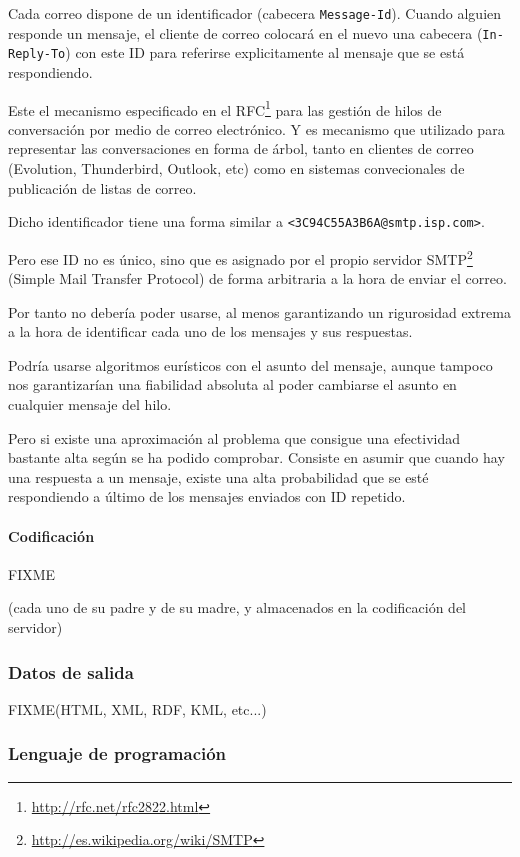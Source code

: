Cada correo dispone de un identificador (cabecera \texttt{Message-Id}). Cuando
alguien responde un mensaje, el cliente de correo colocará en el nuevo una 
cabecera (\texttt{In-Reply-To}) con este ID para referirse explicitamente al 
mensaje que se está respondiendo.

Este el mecanismo especificado en el RFC\footnote{\url{http://rfc.net/rfc2822.html}} 
para las gestión de hilos de conversación por medio de correo electrónico. Y es
mecanismo que utilizado para representar las conversaciones en forma de árbol, 
tanto en clientes de correo (Evolution, Thunderbird, Outlook, etc) como en sistemas 
convecionales de publicación de listas de correo.

Dicho identificador tiene una forma similar a \texttt{<3C94C55A3B6A@smtp.isp.com>}.

Pero ese ID no es único, sino que es asignado por el propio servidor
SMTP\footnote{\url{http://es.wikipedia.org/wiki/SMTP}} (Simple Mail Transfer Protocol) 
de forma arbitraria a la hora de enviar el correo.

Por tanto no debería poder usarse, al menos garantizando un rigurosidad extrema
a la hora de identificar cada uno de los mensajes y sus respuestas.

Podría usarse algoritmos eurísticos con el asunto del mensaje, aunque tampoco nos
garantizarían una fiabilidad absoluta al poder cambiarse el asunto en cualquier
mensaje del hilo.

Pero si existe una aproximación al problema que consigue una efectividad bastante
alta según se ha podido comprobar. Consiste en asumir que cuando hay una respuesta
a un mensaje, existe una alta probabilidad que se esté respondiendo a último de los 
mensajes enviados con ID repetido.

\paragraph{Codificación}

FIXME

(cada uno de su padre y de su madre, y almacenados en la codificación del
servidor)

\subsubsection{Datos de salida}

FIXME(HTML, XML, RDF, KML, etc...)

\subsubsection{Lenguaje de programación}

